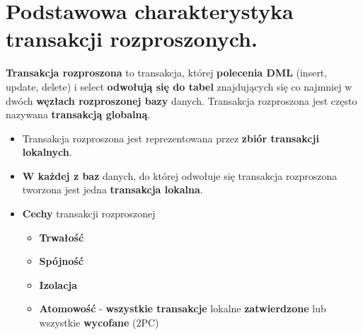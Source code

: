 \documentclass[a4paper]{article}
\begin{document}
    \section{Podstawowa charakterystyka transakcji rozproszonych.}

    \textbf{Transakcja rozproszona} to transakcja, której \textbf{polecenia DML} (insert, update, delete) i select
    \textbf{odwołują się do tabel} znajdujących się co najmniej w dwóch \textbf{węzłach rozproszonej bazy} danych.
    Transakcja rozproszona jest często nazywana \textbf{transakcją globalną}.
    \begin{itemize}
        \item Transakcja rozproszona jest reprezentowana przez \textbf{zbiór transakcji lokalnych}.
        \item \textbf{W każdej z baz} danych, do której odwołuje się transakcja rozproszona tworzona jest jedna \textbf{transakcja lokalna}.
        \item \textbf{Cechy} transakcji rozproszonej
        \begin{itemize}
            \item \textbf{Trwałość}
            \item \textbf{Spójność}
            \item \textbf{Izolacja}
            \item \textbf{Atomowość} - \textbf{wszystkie transakcje} lokalne \textbf{zatwierdzone} lub wszystkie \textbf{wycofane} (2PC)
        \end{itemize}
    \end{itemize}
\end{document}
